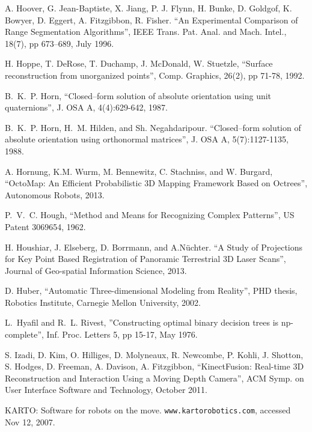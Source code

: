 \documentclass[twocolumn,oneside]{book}
\begin{document}
\begin{thebibliography}{99}
A. Hoover, G. Jean-Baptiste, X. Jiang, P. J. Flynn,
H. Bunke, D. Goldgof, K. Bowyer,
D. Eggert, A. Fitzgibbon, R. Fisher.
``An Experimental Comparison of Range Segmentation Algorithms'',
IEEE Trans. Pat. Anal. and Mach. Intel., 18(7), pp 673--689, July 1996.

H. Hoppe, T. DeRose, T. Duchamp, J. McDonald, W. Stuetzle,
``Surface reconstruction from unorganized points'',
Comp. Graphics, 26(2), pp 71-78, 1992.


B.~K.~P. Horn,
``Closed--form solution of absolute orientation using unit quaternions'',
J. OSA A, 4(4):629-642, 1987.

B.~K.~P. Horn, H.~M. Hilden, and Sh. Negahdaripour.
``Closed--form solution of absolute orientation using orthonormal matrices'',
J. OSA A, 5(7):1127-1135, 1988.

A. Hornung, K.M. Wurm, M. Bennewitz, C. Stachniss, and W. Burgard,
``OctoMap: An Efficient Probabilistic 3D Mapping Framework Based on Octrees'',
Autonomous Robots, 2013.

P.~V.~C. Hough,
``Method and Means for Recognizing Complex Patterns'',
US Patent 3069654, 1962.

H. Houshiar, J. Elseberg, D. Borrmann, and A.N{\"u}chter.
``A Study of Projections for Key Point Based Registration of Panoramic Terrestrial 3D Laser Scans'',
Journal of Geo-spatial Information Science, 2013.


D. Huber,
``Automatic Three-dimensional Modeling from Reality'',
PHD thesis, Robotics Institute, Carnegie Mellon University, 2002.

L.~Hyafil and R.~L. Rivest,
''Constructing optimal binary decision trees is np-complete'',
Inf. Proc. Letters 5, pp 15-17, May 1976.

S. Izadi, D. Kim, O. Hilliges, D. Molyneaux, R. Newcombe, P. Kohli,
J. Shotton, S. Hodges, D. Freeman, A. Davison, A. Fitzgibbon,
``KinectFusion: Real-time 3D Reconstruction and Interaction Using a Moving Depth Camera'',
ACM Symp. on User Interface Software and Technology, October 2011.

KARTO: Software for robots on the move.
\verb+www.kartorobotics.com+, accessed Nov 12, 2007.


\end{thebibliography}
\end{document}
